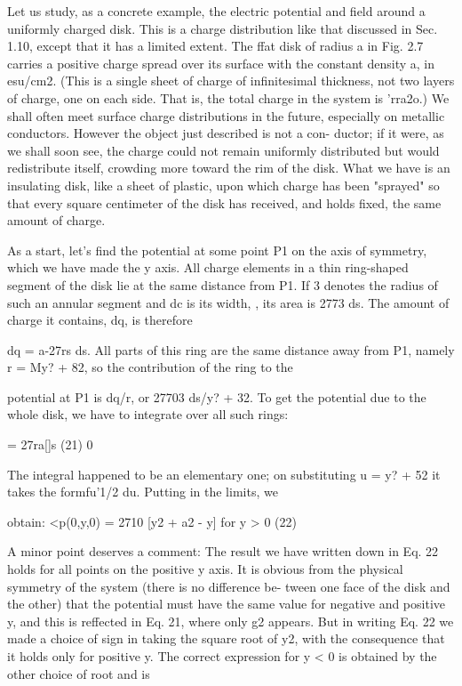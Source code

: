 Let us study, as a concrete example, the electric potential and field
around a uniformly charged disk. This is a charge distribution like
that discussed in Sec. 1.10, except that it has a limited extent. The
ffat disk of radius a in Fig. 2.7 carries a positive charge spread over its
surface with the constant density a, in esu/cm2. (This is a single sheet
of charge of infinitesimal thickness, not two layers of charge, one on
each side. That is, the total charge in the system is 'rra2o.) We shall
often meet surface charge distributions in the future, especially on
metallic conductors. However the object just described is not a con-
ductor; if it were, as we shall soon see, the charge could not remain
uniformly distributed but would redistribute itself, crowding more
toward the rim of the disk. What we have is an insulating disk, like
a sheet of plastic, upon which charge has been "sprayed" so that every
square centimeter of the disk has received, and holds fixed, the same
amount of charge.

As a start, let's find the potential at some point P1 on the axis of
symmetry, which we have made the y axis. All charge elements in a
thin ring-shaped segment of the disk lie at the same distance from P1.
If 3 denotes the radius of such an annular segment and dc is its width, ,
its area is 2773 ds. The amount of charge it contains, dq, is therefore 

 

dq = a-27rs ds. All parts of this ring are the same distance away
from P1, namely r = My? + 82, so the contribution of the ring to the

potential at P1 is dq/r, or 27703 ds/\/y? + 32. To get the potential
due to the whole disk, we have to integrate over all such rings:

= 27ra[\W]s (21)
0

The integral happened to be an elementary one; on substituting
u = y? + 52 it takes the formfu'1/2 du. Putting in the limits, we

obtain:
<p(0,y,0) = 2710 [\/y2 + a2 - y] for y > 0 (22)

A minor point deserves a comment: The result we have written
down in Eq. 22 holds for all points on the positive y axis. It is obvious
from the physical symmetry of the system (there is no difference be-
tween one face of the disk and the other) that the potential must have
the same value for negative and positive y, and this is reffected in
Eq. 21, where only g2 appears. But in writing Eq. 22 we made a
choice of sign in taking the square root of y2, with the consequence
that it holds only for positive y. The correct expression for y < 0 is
obtained by the other choice of root and is

